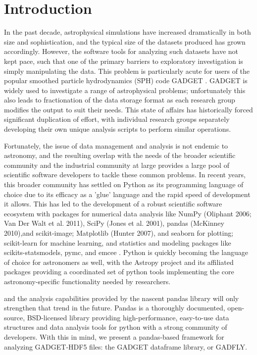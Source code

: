 \section{Introduction}
\label{intro}

In the past decade, astrophysical simulations have increased dramatically in both size and sophistication, and the typical size of the datasets produced has grown accordingly.  
However, the software tools for analyzing such datasets have not kept pace, such that one of the primary barriers to exploratory investigation is simply manipulating the data.  
This problem is particularly acute for users of the popular smoothed particle hydrodynamics (SPH) code GADGET \citep{SpringelYoshidaWhite2001,Springel2005}.  
GADGET is widely used to investigate a range of astrophysical problems; unfortunately this also leads to fractionation of the data storage format as each research group modifies the output to suit their needs.
This state of affairs has historically forced significant duplication of effort, with individual research groups separately developing their own unique analysis scripts to perform similar operations.

Fortunately, the issue of data management and analysis is not endemic to astronomy, and the resulting overlap with the needs of the broader scientific community and the industrial community at large provides a large pool of scientific software developers to tackle these common problems.
In recent years, this broader community has settled on Python as its programming language of choice due to its efficacy as a 'glue' language and the rapid speed of development it allows.  
This has led to the development of a robust scientific software ecosystem with packages for numerical data analysis like NumPy (Oliphant 2006; Van Der Walt et al. 2011), SciPy (Jones et al. 2001), pandas (McKinney 2010),and scikit-image; Matplotlib (Hunter 2007), and seaborn for plotting; scikit-learn for machine learning, and statistics and modeling packages like scikits-statsmodels, pymc, and emcee \citep{Foreman-Mackeyetal2013}.
Python is quickly becoming the language of choice for astronomers as well, with the Astropy project \citep{Robitailleetal2013} and its affiliated packages providing a coordinated set of python tools implementing the core astronomy-specific functionality needed by researchers.


and the analysis capabilities provided by the nascent pandas library will only strengthen that trend in the future.  Pandas is a thoroughly documented, open-source, BSD-licensed library providing high-performance, easy-to-use data structures and data analysis tools for python with a strong community of developers. With this in mind, we present a pandas-based framework for analyzing GADGET-HDF5 files: the GADGET dataframe library, or GADFLY.

